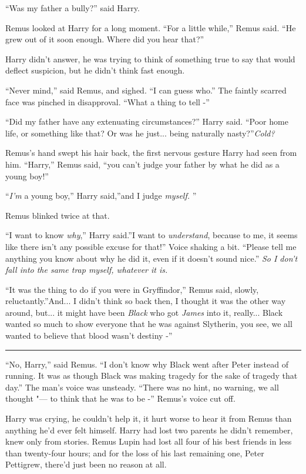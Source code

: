 ``Was my father a bully?'' said Harry.

Remus looked at Harry for a long moment. ``For a little while,'' Remus
said. ``He grew out of it soon enough. Where did you hear that?''

Harry didn't answer, he was trying to think of something true to say
that would deflect suspicion, but he didn't think fast enough.

``Never mind,'' said Remus, and sighed. ``I can guess who.'' The faintly
scarred face was pinched in disapproval. ``What a thing to tell -''

``Did my father have any extenuating circumstances?'' Harry said. ``Poor
home life, or something like that? Or was he just... being
naturally nasty?''\emph{Cold?}

Remus's hand swept his hair back, the first nervous gesture Harry had
seen from him. ``Harry,'' Remus said, ``you can't judge your father by
what he did as a young boy!''

``\emph{I'm} a young boy,'' Harry said,''and I judge \emph{myself.} ''

Remus blinked twice at that.

``I want to know \emph{why},'' Harry said.''I want to \emph{understand},
because to me, it seems like there isn't any possible excuse for that!''
Voice shaking a bit. ``Please tell me anything you know about why he did
it, even if it doesn't sound nice.'' \emph{So I don't fall into the same
trap myself, whatever it is.}

``It was the thing to do if you were in Gryffindor,'' Remus said,
slowly, reluctantly.''And... I didn't think so back then, I thought
it was the other way around, but... it might have been \emph{Black}
who got \emph{James} into it, really... Black wanted so much to
show everyone that he was against Slytherin, you see, we all wanted to
believe that blood wasn't destiny -''

\begin{center}\rule{3in}{0.4pt}\end{center}

``No, Harry,'' said Remus. ``I don't know why Black went after Peter
instead of running. It was as though Black was making tragedy for the
sake of tragedy that day.'' The man's voice was unsteady. ``There was no
hint, no warning, we all thought "--- to think that he was to be -''
Remus's voice cut off.

Harry was crying, he couldn't help it, it hurt worse to hear it from
Remus than anything he'd ever felt himself. Harry had lost two parents
he didn't remember, knew only from stories. Remus Lupin had lost all
four of his best friends in less than twenty-four hours; and for the
loss of his last remaining one, Peter Pettigrew, there'd just been no
reason at all.

